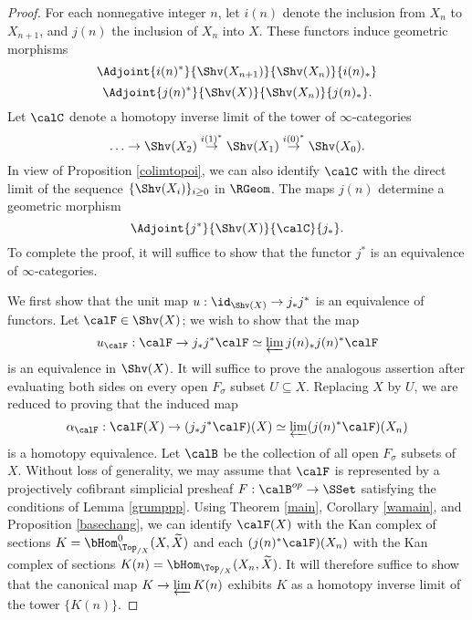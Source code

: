 \begin{proof}
For each nonnegative integer $n$, let $i(n)$ denote the inclusion from
$X_n$ to $X_{n+1}$, and $j(n)$ the inclusion of $X_{n}$ into $X$. 
These functors induce geometric morphisms
$$ \Adjoint{ i(n)^{\ast} }{ \Shv(X_{n+1}) }{ \Shv(X_n)}{i(n)_{\ast}} $$
$$ \Adjoint{ j(n)^{\ast} }{ \Shv(X)}{ \Shv(X_n)}{ j(n)_{\ast}}.$$
Let $\calC$ denote a homotopy inverse limit of the tower of $\infty$-categories
$$ \ldots \rightarrow \Shv( X_2) \stackrel{ i(1)^{\ast}}{\rightarrow} \Shv(X_1)
\stackrel{ i(0)^{\ast}}{\rightarrow} \Shv(X_0).$$
In view of Proposition \ref{colimtopoi}, we can also identify
$\calC$ with the direct limit of the sequence $\{ \Shv(X_i) \}_{i \geq 0}$ in $\RGeom$.
The maps $j(n)$ determine a geometric morphism
$$ \Adjoint{ j^{\ast} }{ \Shv(X)}{\calC}{j_{\ast}}.$$
To complete the proof, it will suffice to show that the functor $j^{\ast}$ is an equivalence of
$\infty$-categories.

We first show that the unit map $u: \id_{\Shv(X)} \rightarrow j_{\ast} j^{\ast}$ is an equivalence of functors.
Let $\calF \in \Shv(X)$; we wish to show that the map
$$u_{\calF}: \calF \rightarrow j_{\ast} j^{\ast} \calF
\simeq \varprojlim j(n)_{\ast} j(n)^{\ast} \calF$$
is an equivalence in $\Shv(X)$. It will suffice to prove the analogous assertion after evaluating
both sides on every open $F_{\sigma}$ subset $U \subseteq X$. Replacing $X$ by $U$, we are reduced to proving that the induced map
$$ \alpha_{\calF}: \calF(X) \rightarrow (j_{\ast} j^{\ast} \calF)(X) \simeq \varprojlim (j(n)^{\ast} \calF)(X_n)$$
is a homotopy equivalence. Let $\calB$ be the collection of all open $F_{\sigma}$ subsets of $X$. Without loss of generality, we may assume that $\calF$ is represented by a projectively cofibrant simplicial presheaf $F: \calB^{op} \rightarrow \SSet$ satisfying the conditions
of Lemma \ref{grumppp}. Using Theorem \ref{main}, Corollary \ref{wamain}, and Proposition \ref{basechang}, we can identify
$\calF(X)$ with the Kan complex of sections $K = \bHom^{0}_{ \Top_{/X}}( X, \widetilde{X})$ and
each $( j(n)^{\ast} \calF)(X_n)$ with the Kan complex of sections $K(n) = \bHom_{ \Top_{/X}}(X_n, \widetilde{X})$. It will therefore suffice to show that the canonical map
$K \rightarrow \varprojlim K(n)$ exhibits $K$ as a homotopy inverse limit of the tower
$\{ K(n) \}$. 


\end{proof}
